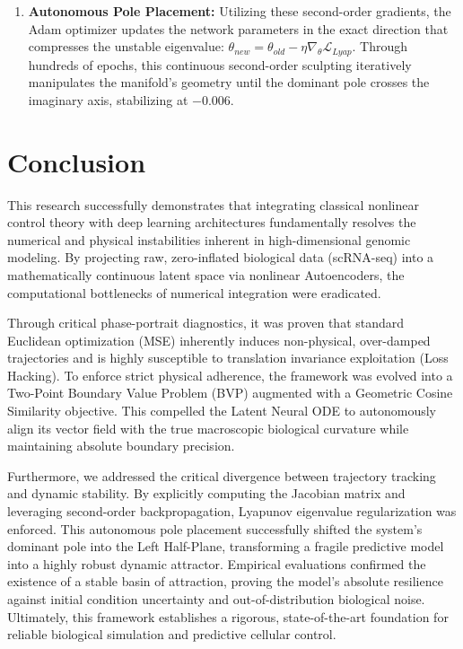 \documentclass[12pt, a4paper]{article}
\begin{document}
\begin{enumerate}
		\item \textbf{Autonomous Pole Placement:} Utilizing these second-order gradients, the Adam optimizer updates the network parameters in the exact direction that compresses the unstable eigenvalue: $\theta_{new} = \theta_{old} - \eta \nabla_\theta \mathcal{L}_{Lyap}$. Through hundreds of epochs, this continuous second-order sculpting iteratively manipulates the manifold's geometry until the dominant pole crosses the imaginary axis, stabilizing at $-0.006$.
	\end{enumerate}
	
	\section{Conclusion}
	
	This research successfully demonstrates that integrating classical nonlinear control theory with deep learning architectures fundamentally resolves the numerical and physical instabilities inherent in high-dimensional genomic modeling. By projecting raw, zero-inflated biological data (scRNA-seq) into a mathematically continuous latent space via nonlinear Autoencoders, the computational bottlenecks of numerical integration were eradicated. 
	
	Through critical phase-portrait diagnostics, it was proven that standard Euclidean optimization (MSE) inherently induces non-physical, over-damped trajectories and is highly susceptible to translation invariance exploitation (Loss Hacking). To enforce strict physical adherence, the framework was evolved into a Two-Point Boundary Value Problem (BVP) augmented with a Geometric Cosine Similarity objective. This compelled the Latent Neural ODE to autonomously align its vector field with the true macroscopic biological curvature while maintaining absolute boundary precision.
	
	Furthermore, we addressed the critical divergence between trajectory tracking and dynamic stability. By explicitly computing the Jacobian matrix and leveraging second-order backpropagation, Lyapunov eigenvalue regularization was enforced. This autonomous pole placement successfully shifted the system's dominant pole into the Left Half-Plane, transforming a fragile predictive model into a highly robust dynamic attractor. Empirical evaluations confirmed the existence of a stable basin of attraction, proving the model's absolute resilience against initial condition uncertainty and out-of-distribution biological noise. Ultimately, this framework establishes a rigorous, state-of-the-art foundation for reliable biological simulation and predictive cellular control.
	
\end{document}
